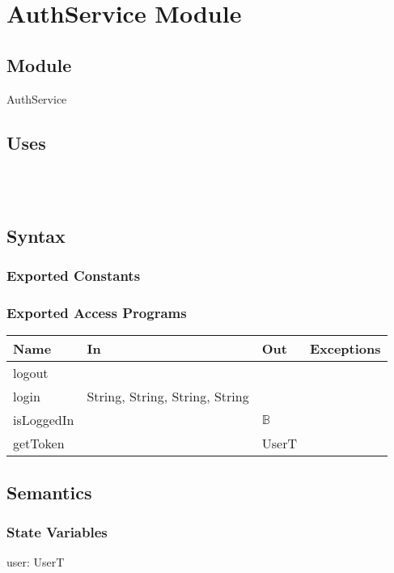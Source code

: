 \documentclass[12pt, titlepage]{article}
\begin{document}
\newpage

\section{AuthService Module} \label{AuthService} 
\subsection{Module}

AuthService

\subsection{Uses}
\\
\\

\subsection{Syntax}

\subsubsection{Exported Constants}

\subsubsection{Exported Access Programs}

\begin{center}
\begin{tabular}{ | p{2cm} | p{4cm} | p{4cm} |  p{3cm} |}
\hline
\textbf{Name} & \textbf{In} & \textbf{Out} & \textbf{Exceptions} \\
\hline
logout &  &  &  \\
login & String, String, String, String & & \\
isLoggedIn &  &  $\mathbb{B}$ &  \\
getToken &  &  UserT &  \\
\hline
\end{tabular}
\end{center}

\subsection{Semantics}

\subsubsection{State Variables}
user: UserT
\end{document}
